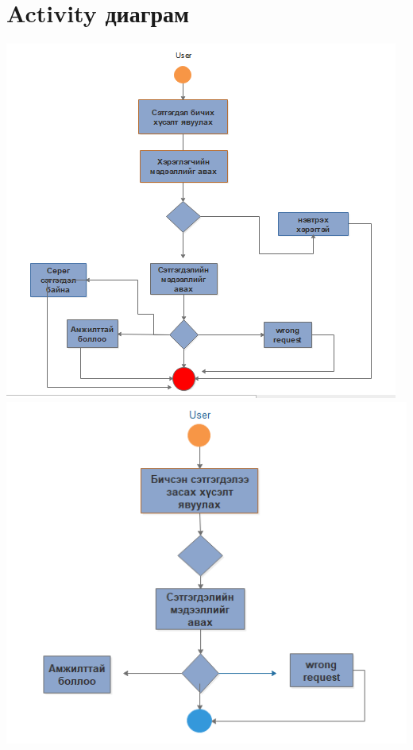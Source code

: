 \documentclass[12pt]{article}
\begin{document}
\section{Activity диаграм}
\includegraphics[scale=0.5]{Activity1} 
\includegraphics[scale=0.5]{Activity2} 
\end{document}

